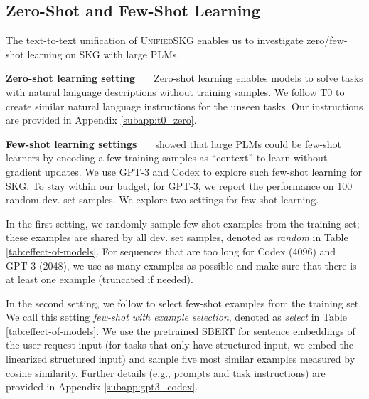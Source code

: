 \subsection{Zero-Shot and Few-Shot Learning}
\label{subsec:pretrained-models-analysis}
The text-to-text unification of \textsc{Unified}SKG enables us to investigate zero/few-shot learning on SKG with large PLMs. 

\textbf{Zero-shot learning setting \ \ } Zero-shot learning enables models to solve tasks with natural language descriptions without training samples. We follow T0 \cite{sanh2021multitask} to create similar natural language instructions for the unseen tasks. Our instructions are provided in Appendix \ref{subapp:t0_zero}. 

\textbf{Few-shot learning settings \ \ } \citet{brown2020language} showed that large PLMs could be few-shot learners by encoding a few training samples as ``context'' to learn without gradient updates. We use GPT-3 \cite{brown2020language} and Codex \cite{chen2021evaluating} to explore such few-shot learning for SKG. To stay within our budget, for GPT-3, we report the performance on 100 random dev. set samples. We explore two settings for few-shot learning. 

In the first setting, we randomly sample few-shot examples from the training set; these examples are shared by all dev. set samples, denoted as \textit{random} in Table \ref{tab:effect-of-models}. 
For sequences that are too long for Codex (4096) and GPT-3 (2048), we use as many examples as possible and make sure that there is at least one example (truncated if needed). 

In the second setting, we follow \citet{gao2021making} to select few-shot examples from the training set. We call this setting \textit{few-shot with example selection}, denoted as \textit{select} in Table \ref{tab:effect-of-models}. 
We use the pretrained SBERT \cite{reimers-2020-multilingual-sentence-bert} for sentence embeddings of the user request input (for tasks that only have structured input, we embed the linearized structured input) and sample five most similar examples measured by cosine similarity. Further details (e.g., prompts and task instructions) are provided in Appendix \ref{subapp:gpt3_codex}.

